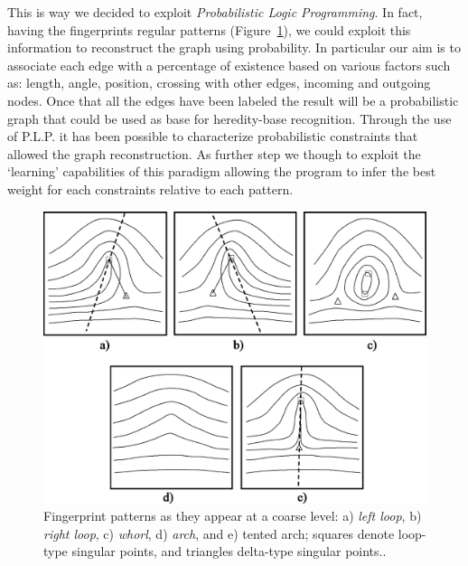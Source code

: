 \documentclass[8pt]{article}
\begin{document}
    This is way we decided to exploit \textit{Probabilistic Logic Programming}.
   	In fact, having the fingerprints regular patterns (Figure~\ref{fig:patterns}), we could exploit this information to reconstruct the graph using probability.
   	In particular our aim is to associate each edge with a percentage of existence based on various factors such as: length, angle, position, crossing with other edges, incoming and outgoing nodes.
   	Once that all the edges have been labeled the result will be a probabilistic graph that could be used as base for heredity-base recognition.
   	Through the use of P.L.P. it has been possible to characterize probabilistic constraints that allowed the graph reconstruction.
   	As further step we though to exploit the \textquoteleft learning' capabilities of this paradigm allowing the program to infer the best weight for each constraints relative to each pattern.

    \begin{figure}
		\centering
		\includegraphics[width=0.8\linewidth]{img/patterns}
		\caption{Fingerprint patterns as they appear at a coarse level: a) \textit{left loop}, b) \textit{right loop}, c)
			\textit{whorl}, d) \textit{\textit{arch}}, and e) tented arch; squares denote loop-type singular points, and triangles
			delta-type singular points..}
		\label{fig:patterns}
	\end{figure}%





\end{document}

